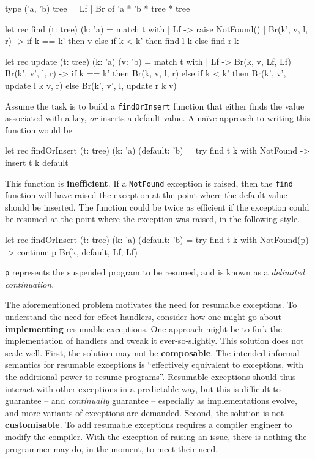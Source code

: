\begin{ocaml}
type ('a, 'b) tree = Lf | Br of 'a * 'b * tree * tree 

let rec find (t: tree) (k: 'a) = match t with 
 | Lf -> raise NotFound()
 | Br(k', v, l, r) -> if k == k' then v 
                      else if k < k' then find l k
                           else find r k

let rec update (t: tree) (k: 'a) (v: 'b) = match t with 
  | Lf -> Br(k, v, Lf, Lf)
  | Br(k', v', l, r) -> if k == k' then Br(k, v, l, r)
                       else if k < k' then Br(k', v', update l k v, r)
                            else Br(k', v', l, update r k v)
\end{ocaml}

Assume the task is to build a \texttt{findOrInsert} function that either finds the value associated with a key, \textit{or} inserts a default value. A naïve approach to writing this function would be
\begin{ocaml}  
let rec findOrInsert (t: tree) (k: 'a) (default: 'b) = 
  try find t k with NotFound -> insert t k default
\end{ocaml}
This function is \textbf{inefficient}. If a \texttt{NotFound} exception is raised, then the \texttt{find} function will have raised the exception at the point where the default value should be inserted. The function could be twice as efficient if the exception could be resumed at the point where the exception was raised, in the following style.
\begin{ocaml}
let rec findOrInsert (t: tree) (k: 'a) (default: 'b) = 
  try find t k with NotFound(p) -> continue p Br(k, default, Lf, Lf)
\end{ocaml}
\texttt{p} represents the suspended program to be resumed, and is known as a \textit{delimited continuation}.

The aforementioned problem motivates the need for resumable exceptions. To understand the need for effect handlers, consider how one might go about \textbf{implementing} resumable exceptions. One approach might be to fork the implementation of handlers and tweak it ever-so-slightly. This solution does not scale well. First, the solution may not be \textbf{composable}. The intended informal semantics for resumable exceptions is ``effectively equivalent to exceptions, with the additional power to resume programs''. Resumable exceptions should thus interact with other exceptions in a predictable way, but this is difficult to guarantee -- and \textit{continually} guarantee -- especially as implementations evolve, and more variants of exceptions are demanded. Second, the solution is not \textbf{customisable}. To add resumable exceptions requires a compiler engineer to modify the compiler. With the exception of raising an issue, there is nothing the programmer may do, in the moment, to meet their need.


